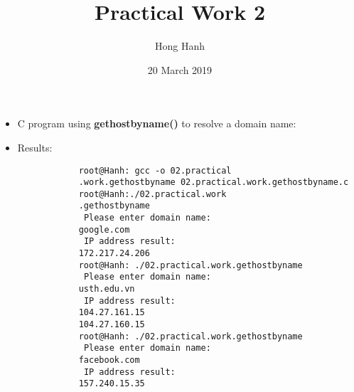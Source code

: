 \documentclass{article}
\title{Practical Work 2}
\author {Hong Hanh}
\date{20 March 2019}
\begin{document}
\maketitle

\begin{itemize}
    \item C program using \textbf{gethostbyname()} to resolve a domain name:
	\item Results:
		\begin{verbatim}
			root@Hanh: gcc -o 02.practical
			.work.gethostbyname 02.practical.work.gethostbyname.c
			root@Hanh:./02.practical.work
			.gethostbyname
			 Please enter domain name:
			google.com
			 IP address result:
			172.217.24.206
			root@Hanh: ./02.practical.work.gethostbyname
			 Please enter domain name:
			usth.edu.vn
			 IP address result:
			104.27.161.15
			104.27.160.15
			root@Hanh: ./02.practical.work.gethostbyname
			 Please enter domain name:
			facebook.com
			 IP address result:
			157.240.15.35
		\end{verbatim}
\end{itemize}
\end{document}
